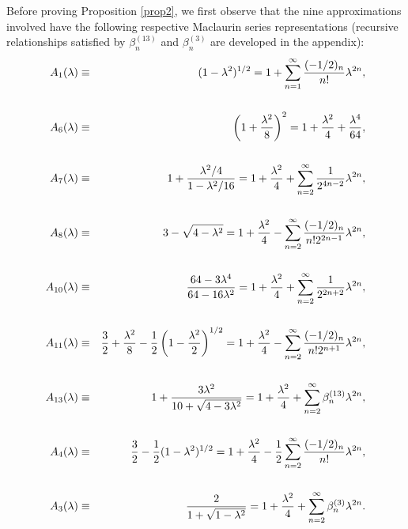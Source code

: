 \documentclass[final,oneeqnum]{siamltex}
\begin{document}
Before proving Proposition \ref{prop2}, we first observe that the
nine approximations involved  have the following respective
Maclaurin series  representations (recursive relationships satisfied
by $\beta^{(13)}_{n}$ and $\beta^{(3)}_{n}$ are
developed in the appendix):
\begin{eqnarray}
  A_{1}(\lambda) &\equiv&(1-\lambda^2)^{1/2}=1 +
\sum_{n=1}^{\infty}\frac{(-1/2)_{n}}{n!}\lambda^{2n}, \label{eqA1}\\
\vspace*{-.2in}\nonumber\\   A_{6}(\lambda)
&\equiv&\left(1+\frac{\lambda^2}{8}\right)^2 = 1 + \frac{\lambda^2}{4}+
\frac{\lambda^4}{64},\label{eqA6}\\
\vspace*{-.2in}\nonumber\\
  A_{7}(\lambda) &\equiv&1+\frac{\lambda^2/4}{1-\lambda^2/16} = 1 +
\frac{\lambda^2}{4} +
\sum_{n=2}^{\infty}\frac{1}{2^{4n-2}}\lambda^{2n},\label{eqA7}\\
\vspace*{-.2in}\nonumber\\
  A_{8}(\lambda) &\equiv&3-\sqrt{4-\lambda^2}=1 + \frac{\lambda^2}{4} -
\sum_{n=2}^{\infty}\frac{(-1/2)_{n}}{n!2^{2n-1}}\lambda^{2n},\label{eqA8}\\
\vspace*{-.2in}\nonumber\\
  A_{10}(\lambda) &\equiv&\frac{64-3\lambda^4}{64-16\lambda^2}=1 +
\frac{\lambda^2}{4} +
\sum_{n=2}^{\infty}\frac{1}{2^{2n+2}}\lambda^{2n},\label{eqA10}\\
\vspace*{-.2in}\nonumber\\
  A_{11}(\lambda)
&\equiv&\frac{3}{2}+\frac{\lambda^2}{8}-\frac{1}{2}\left(1-\frac{\lambda^2}{2}\right)^{1/2}=1 +
\frac{\lambda^2}{4} -
\sum_{n=2}^{\infty}\frac{(-1/2)_{n}}{n!2^{n+1}}\lambda^{2n},\label{eqA11}\\
\vspace*{-.2in}\nonumber\\
  A_{13}(\lambda) &\equiv&1+\frac{3\lambda^2 }{10+\sqrt{4-3\lambda^2}}=1 +
\frac{\lambda^2}{4} +
\sum_{n=2}^{\infty}\beta^{(13)}_{n}\lambda^{2n},\label{eqA13}\\
\vspace*{-.2in}\nonumber\\
  A_{4}(\lambda) &\equiv&\frac{3}{2}-\frac{1}{2}(1-\lambda^2)^{1/2}=1 +
\frac{\lambda^2}{4} -
\frac{1}{2}\sum_{n=2}^{\infty}\frac{(-1/2)_{n}}{n!}\lambda^{2n},\label{eqA4}\\
\vspace*{-.2in}\nonumber\\
  A_{3}(\lambda) &\equiv&\frac{2}{1+\sqrt{1-\lambda^2}}=1 +
\frac{\lambda^2}{4} +
\sum_{n=2}^{\infty}\beta^{(3)}_{n}\lambda^{2n}.\label{eqA3}
\end{eqnarray}
\end{document}
